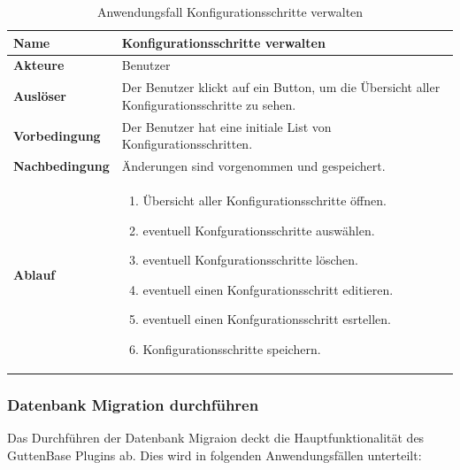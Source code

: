 \begin{table}[H]
	\centering
	\begin{tabular}{ |p{4cm}|p{8cm}| }
		\hline
		\textbf{Name} & Konfigurationsschritte verwalten  \\
		\hline
		\textbf{Akteure} &  Benutzer \\
		\hline
		\textbf{Auslöser} &  Der Benutzer klickt auf ein Button, um die Übersicht aller Konfigurationsschritte zu sehen. \\
		\hline
		\textbf{Vorbedingung} & Der Benutzer hat eine initiale List von Konfigurationsschritten.  \\
		\hline
		\textbf{Nachbedingung} & Änderungen sind vorgenommen und gespeichert.  \\
		\hline
		\textbf{Ablauf} & 
		\begin{enumerate}
			\item Übersicht aller Konfigurationsschritte öffnen.
			\item eventuell Konfgurationsschritte auswählen.
			\item eventuell Konfgurationsschritte löschen.
			\item eventuell einen Konfgurationsschritt editieren.
			\item eventuell einen Konfgurationsschritt esrtellen.
			\item Konfigurationsschritte speichern.
		\end{enumerate}   \\
		\hline
		
	\end{tabular}
	\caption{Anwendungsfall Konfigurationsschritte verwalten}
	\label{table:ks-speichern}
\end{table}



\subsubsection{Datenbank Migration durchführen}
Das Durchführen der Datenbank Migraion deckt die Hauptfunktionalität des GuttenBase Plugins ab. Dies wird in folgenden Anwendungsfällen unterteilt: 
